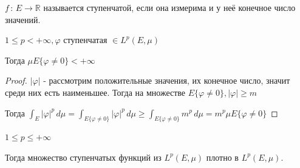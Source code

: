 \begin{definition}
    $f \, : \, E \to \mathbb{R}$ называется ступенчатой, если она измерима и у неё конечное число значений.
\end{definition}

\begin{lemma}
    $1 \leqslant p < +\infty, \varphi$ ступенчатая $\in L^p (E, \mu)$

    Тогда $\mu E \{ \varphi \neq 0 \} < +\infty$
\end{lemma}

\begin{proof}
    $|\varphi|$ - рассмотрим положительные значения, их конечное число, значит среди них есть наименьшее. Тогда
    на множестве $E \{ \varphi \neq 0 \}, |\varphi| \geqslant m$

    Тогда $\int_E |\varphi|^p \, d\mu = \int_{E \{ \varphi \neq 0 \}} |\varphi|^p \, d\mu \geqslant \int_{E \{ \varphi \neq 0 \}} m^p \, d\mu = m^p \mu E \{ \varphi \neq 0 \}$
\end{proof}

\begin{theorem}
    $1 \leqslant p \leqslant +\infty$

    Тогда множество ступенчатых функций из $L^p (E, \mu)$ плотно в $L^p (E, \mu)$.
\end{theorem}

